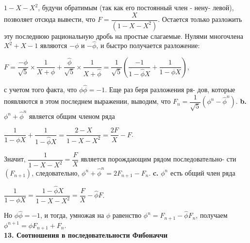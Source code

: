 \noindent
$1-X-X^2$, будучи обратимым (так как его постоянный член - нену-\linebreak
левой), позволяет отсюда вывести, что $F=\dfrac{X}{(1-X-X^2)}$. Остается только\linebreak
разложить эту последнюю рациональную дробь на простые слагаемые.\linebreak
Нулями многочлена $X^2+X-1$ являются $-\phi$ и $-\hat{\phi}$, и быстро получается\linebreak
разложение:
\begin{center}
$F=\dfrac{-\phi}{\sqrt{5}}\times\dfrac{1}{X+\phi}+\dfrac{\hat{\phi}}{\sqrt{5}}\times\dfrac{1}{X+\hat{\phi}} = \dfrac{1}{\sqrt{5}}\left(\dfrac{-1}{1-\hat{\phi}X}+\dfrac{1}{1-\phi X}\right)$,
\end{center}
с учетом того факта, что $\phi\hat{\phi} = -1$. Еще раз беря разложения ря-\linebreak
дов, которые появляются в этом последнем выражении, выводим, что\linebreak
$F_{n}=\dfrac{1}{\sqrt{5}}(\phi^n-\hat{\phi}^n)$.\newline
\hspace*{15pt}\textbf{b.} $\phi^n+\hat{\phi}^n$ является общим членом ряда
\begin{center}
$\dfrac{1}{1-\phi X}+\dfrac{1}{1-\hat{\phi}X}=\dfrac{2-X}{1-X-X^2}=\dfrac{2F}{X}-F$.
\end{center}
Значит, $\dfrac{1}{1-X-X^2}=\dfrac{F}{X}$ является порождающим рядом последовательно-\linebreak
сти $(F_{n+1})$, следовательно, $\phi^n+\hat{\phi}^n=2F_{n+1}-F_{n}$.\newline
\hspace*{15pt}\textbf{c.} $\phi^n$ есть общий член ряда
\begin{center}
$\dfrac{1}{1-\phi X}=\dfrac{1-\hat{\phi} X}{1-X-X^2}=\dfrac{F}{X}-\hat{\phi}F$.
\end{center}

Но $\phi\hat{\phi}=-1$, и тогда, умножая на $\phi$ равенство $\phi^n=F_{n+1}-\hat{\phi}F_{n}$, получаем\linebreak
$\phi^{n+1}=\phi F_{n+1}+F_{n}$.\\

\noindent\textbf{13. Соотношения в последовательности Фибоначчи}\\

